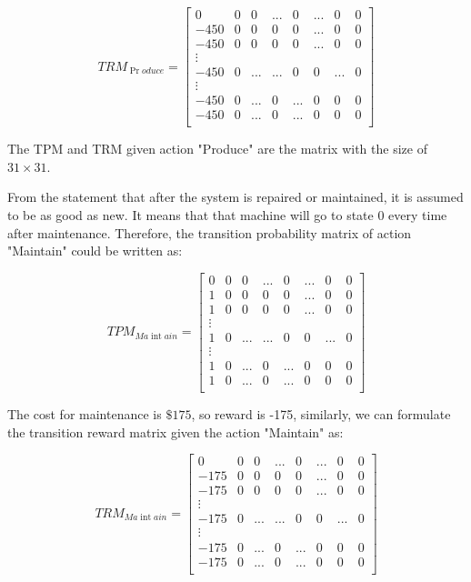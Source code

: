 \documentclass[12pt]{article}%
\begin{document}
\[TR{{M}_{\Pr oduce}}=\left[ \begin{matrix}
   0 & 0 & 0 & ... & 0 & ... & 0 & 0  \\
   -450 & 0 & 0 & 0 & 0 & ... & 0 & 0  \\
   -450 & 0 & 0 & 0 & 0 & ... & 0 & 0  \\
   \vdots  & {} & {} & {} & {} & {} & {} & {}  \\
   -450 & 0 & ... & ... & 0 & 0 & ... & 0  \\
   \vdots  & {} & {} & {} & {} & {} & {} & {}  \\
   -450 & 0 & ... & 0 & ... & 0 & 0 & 0  \\
   -450 & 0 & ... & 0 & ... & 0 & 0 & 0  \\
\end{matrix} \right]\]

The TPM and TRM given action "Produce" are the matrix with the size of $31 \times 31$.

From the statement that after the system is repaired or maintained, it is assumed to be as good as new. It means that that machine will go to state 0 every time after maintenance. Therefore, the transition probability matrix of action "Maintain" could be written as:

\[TP{{M}_{Ma\operatorname{int}ain}}=\left[ \begin{matrix}
   0 & 0 & 0 & ... & 0 & ... & 0 & 0  \\
   1 & 0 & 0 & 0 & 0 & ... & 0 & 0  \\
   1 & 0 & 0 & 0 & 0 & ... & 0 & 0  \\
   \vdots  & {} & {} & {} & {} & {} & {} & {}  \\
   1 & 0 & ... & ... & 0 & 0 & ... & 0  \\
   \vdots  & {} & {} & {} & {} & {} & {} & {}  \\
   1 & 0 & ... & 0 & ... & 0 & 0 & 0  \\
   1 & 0 & ... & 0 & ... & 0 & 0 & 0  \\
\end{matrix} \right]\]

The cost for maintenance is $\$175$, so reward is -175, similarly, we can formulate the transition reward matrix given the action "Maintain" as:

\[TR{{M}_{Ma\operatorname{int}ain}}=\left[ \begin{matrix}
   0 & 0 & 0 & ... & 0 & ... & 0 & 0  \\
   -175 & 0 & 0 & 0 & 0 & ... & 0 & 0  \\
   -175 & 0 & 0 & 0 & 0 & ... & 0 & 0  \\
   \vdots  & {} & {} & {} & {} & {} & {} & {}  \\
   -175 & 0 & ... & ... & 0 & 0 & ... & 0  \\
   \vdots  & {} & {} & {} & {} & {} & {} & {}  \\
   -175 & 0 & ... & 0 & ... & 0 & 0 & 0  \\
   -175 & 0 & ... & 0 & ... & 0 & 0 & 0  \\
\end{matrix} \right]\]
\end{document}
